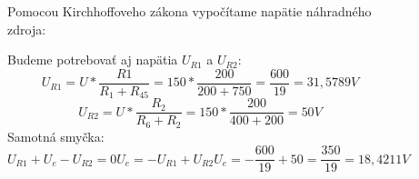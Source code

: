 \begin{figure}[!ht]
\begin{center}
    Pomocou Kirchhoffoveho zákona vypočítame napätie náhradného zdroja:
    
    Budeme potrebovať aj napätia $U_{R1}$ a $U_{R2}$:
    \[
        U_{R1} = U * \frac{R1}{R_1 + R_{45}} = 
        150 * \frac{200}{200 + 750} = \frac{600}{19} = 31,5789 V
    \]
    \[
        U_{R2} = U * \frac{R_2}{R_6 + R_2} = 
        150 * \frac{200}{400 + 200} = 50 V
    \]
    Samotná smyčka:
    \[
        U_{R1} + U_e - U_{R2} = 0
        U_e = -U_{R1} + U_{R2}
        U_e = -\frac{600}{19} + 50 = \frac{350}{19} = 18,4211 V
    \]
\end{center}
\end{figure} 